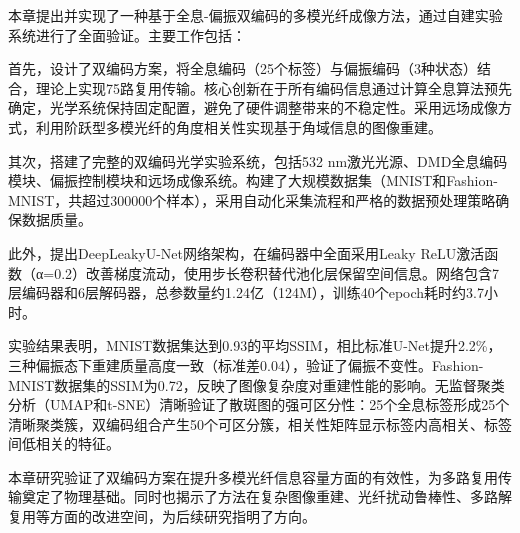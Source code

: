 {本章提出并实现了一种基于全息-偏振双编码的多模光纤成像方法，通过自建实验系统进行了全面验证。主要工作包括：

首先，设计了双编码方案，将全息编码（25个标签）与偏振编码（3种状态）结合，理论上实现75路复用传输。核心创新在于所有编码信息通过计算全息算法预先确定，光学系统保持固定配置，避免了硬件调整带来的不稳定性。采用远场成像方式，利用阶跃型多模光纤的角度相关性实现基于角域信息的图像重建。

其次，搭建了完整的双编码光学实验系统，包括532 nm激光光源、DMD全息编码模块、偏振控制模块和远场成像系统。构建了大规模数据集（MNIST和Fashion-MNIST，共超过300000个样本），采用自动化采集流程和严格的数据预处理策略确保数据质量。

此外，提出DeepLeakyU-Net网络架构，在编码器中全面采用Leaky ReLU激活函数（α=0.2）改善梯度流动，使用步长卷积替代池化层保留空间信息。网络包含7层编码器和6层解码器，总参数量约1.24亿（124M），训练40个epoch耗时约3.7小时。

实验结果表明，MNIST数据集达到0.93的平均SSIM，相比标准U-Net提升2.2\%，三种偏振态下重建质量高度一致（标准差0.04），验证了偏振不变性。Fashion-MNIST数据集的SSIM为0.72，反映了图像复杂度对重建性能的影响。无监督聚类分析（UMAP和t-SNE）清晰验证了散斑图的强可区分性：25个全息标签形成25个清晰聚类簇，双编码组合产生50个可区分簇，相关性矩阵显示标签内高相关、标签间低相关的特征。

本章研究验证了双编码方案在提升多模光纤信息容量方面的有效性，为多路复用传输奠定了物理基础。同时也揭示了方法在复杂图像重建、光纤扰动鲁棒性、多路解复用等方面的改进空间，为后续研究指明了方向。

}

